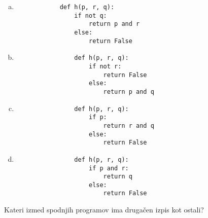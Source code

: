 \documentclass[arhiv, 10pt]{../izpit}
\begin{document}
        \begin{multicols}{2}
        \begin{enumerate}[(a)]
\item 
            \begin{verbatim}
            def h(p, r, q):
                if not q:
                    return p and r
                else:
                    return False
            \end{verbatim}
        
\item 
                \begin{verbatim}
                def h(p, r, q):
                    if not r:
                        return False
                    else:
                        return p and q
                \end{verbatim}
            
\item 
                \begin{verbatim}
                def h(p, r, q):
                    if p:
                        return r and q
                    else:
                        return False
                \end{verbatim}
            
\item 
                \begin{verbatim}
                def h(p, r, q):
                    if p and r:
                        return q
                    else:
                        return False
                \end{verbatim}
            
\end{enumerate}

        \end{multicols}
    
        \naloga*
        
        Kateri izmed spodnjih programov ima drugačen izpis kot ostali?
    
\end{document}
